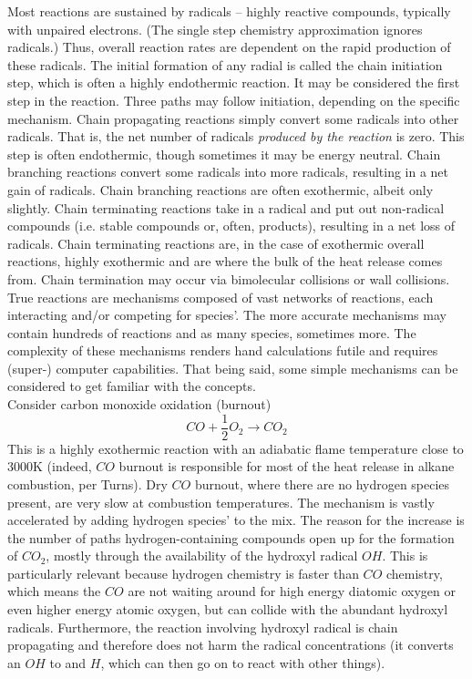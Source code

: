 \documentclass[11pt]{article}
\begin{document}
Most reactions are sustained by radicals -- highly reactive compounds, typically with unpaired electrons. (The single step chemistry approximation ignores radicals.) Thus, overall reaction rates are dependent on the rapid production of these radicals. The initial formation of any radial is called the chain initiation step, which is often a highly endothermic reaction. It may be considered the first step in the reaction. Three paths may follow initiation, depending on the specific mechanism. Chain propagating reactions simply convert some radicals into other radicals. That is, the net number of radicals \emph{produced by the reaction} is zero. This step is often endothermic, though sometimes it may be energy neutral. Chain branching reactions convert some radicals into more radicals, resulting in a net gain of radicals. Chain branching reactions are often exothermic, albeit only slightly. Chain terminating reactions take in a radical and put out non-radical compounds (i.e. stable compounds or, often, products), resulting in a net loss of radicals. Chain terminating reactions are, in the case of exothermic overall reactions, highly exothermic and are where the bulk of the heat release comes from. Chain termination may occur via bimolecular collisions or wall collisions.\\

True reactions are mechanisms composed of vast networks of reactions, each interacting and/or competing for species'. The more accurate mechanisms may contain hundreds of reactions and as many species, sometimes more. The complexity of these mechanisms renders hand calculations futile and requires (super-) computer capabilities. That being said, some simple mechanisms can be considered to get familiar with the concepts.\\

Consider carbon monoxide oxidation (burnout)
$$CO + \frac{1}{2}O_2 \to CO_2$$
This is a highly exothermic reaction with an adiabatic flame temperature close to 3000K (indeed, $CO$ burnout is responsible for most of the heat release in alkane combustion, per Turns). Dry $CO$ burnout, where there are no hydrogen species present, are very slow at combustion temperatures. The mechanism is vastly accelerated by adding hydrogen species' to the mix. The reason for the increase is the number of paths hydrogen-containing compounds open up for the formation of $CO_2$, mostly through the availability of the hydroxyl radical $OH$. This is particularly relevant because hydrogen chemistry is faster than $CO$ chemistry, which means the $CO$ are not waiting around for high energy diatomic oxygen or even higher energy atomic oxygen, but can collide with the abundant hydroxyl radicals. Furthermore, the reaction involving hydroxyl radical is chain propagating and therefore does not harm the radical concentrations (it converts an $OH$ to and $H$, which can then go on to react with other things).\\
\end{document}
